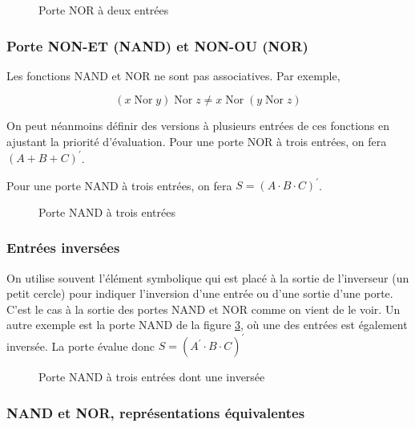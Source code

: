 \documentclass[11pt]{article}
\begin{document}
\begin{figure}[htbp]
\centering

\caption{\label{fig:org6cf46a8}Porte NOR à deux entrées}
\end{figure}

\subsubsection{Porte NON-ET (NAND) et NON-OU (NOR)}
\label{sec:orge5ce18a}

Les fonctions NAND et NOR ne sont pas associatives. Par exemple,

$$
(x \operatorname{Nor} y) \operatorname{Nor} z \neq x \operatorname{Nor} (y \operatorname{Nor} z) 
$$

On peut néanmoins définir des versions à plusieurs entrées de ces
fonctions en ajustant la priorité d'évaluation. Pour une porte NOR à
trois entrées, on fera \((A + B + C)^\prime\).

Pour une porte NAND à trois entrées, on fera \(S = (A \cdot B \cdot
C)^\prime\).

\begin{figure}[htbp]
\centering

\caption{\label{fig:org877bc12}Porte NAND à trois entrées}
\end{figure}

\subsubsection{Entrées inversées}
\label{sec:org12de78d}

On utilise souvent l'élément symbolique qui est placé à la sortie de
l'inverseur (un petit cercle) pour indiquer l'inversion d'une entrée
ou d'une sortie d'une porte. C'est le cas à la sortie des portes NAND
et NOR comme on vient de le voir. Un autre exemple est la porte NAND
de la figure \ref{fig:org7b053a3}, où une des entrées est également
inversée. La porte évalue donc \(S =  (A^\prime \cdot B  \cdot C)^\prime\)

\begin{figure}[htbp]
\centering

\caption{\label{fig:org7b053a3}Porte NAND à trois entrées dont une inversée}
\end{figure} 

\subsubsection{NAND et NOR, représentations équivalentes}
\label{sec:org7f639fe}
\end{document}
